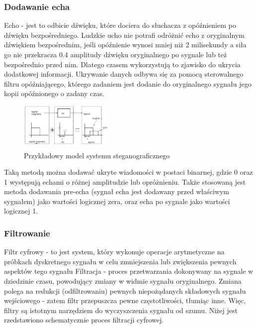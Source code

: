 \documentclass[a4paper,titleauthor]{mwart}
\begin{document}
\subsubsection{Dodawanie echa}
Echo - jest to odbicie dźwięku, które dociera do słuchacza z opóźnieniem po dźwięku bezpośredniego.
\newline\newline
Ludzkie ucho nie potrafi odróżnić echo z oryginalnym dźwiękiem bezpośrednim, jeśli opóźnienie wynosi mniej niż 2 milisekundy a siła go nie przekracza 0.4 amplitudy dźwięku oryginalnego po sygnale lub też bezpośrednio przed nim.
\newline\newline
Dlatego czasem wykorzystują to zjawisko do ukrycia dodatkowej informacji. Ukrywanie danych odbywa się za pomocą sterowalnego filtru opóźniającego, którego zadaniem jest dodanie do oryginalnego sygnału jego kopii opóźnionego o zadany czas. 
\newline\newline

  \begin{figure}[h]
	\centering
	\includegraphics[width=0.4\textwidth]{echo}
	\caption{Przykładowy model systemu steganograficznego}
\end{figure}

Taką metodą można dodawać ukryte wiadomości w postaci binarnej, gdzie 0 oraz 1 występują echami o różnej amplitudzie lub opróżnieniu. Także stosowaną jest metoda dodawania pre-echa (sygnał echa jest dodawany przed właściwym sygnałem) jako wartości logicznej zera, oraz echa po sygnale jako wartości logicznej 1. 
\newline\newline

\subsubsection{Filtrowanie}

Filtr cyfrowy - to jest system, który wykonuje operacje arytmetyczne na próbkach dyskretnego sygnału w celu zmniejszenia lub zwiększenia pewnych aspektów tego sygnału
\newline\newline
Filtracja - proces przetwarzania dokonywany na sygnale w dziedzinie czasu, powodujący zmiany w widmie sygnału oryginalnego. Zmiana polega na redukcji (odfiltrowaniu) pewnych niepożądanych składowych sygnału wejściowego - zatem filtr przepuszcza pewne częstotliwości, tłumiąc inne. Więc, filtry są istotnym narzędziem do wyczyszczenia sygnału od szumu. Niżej jest rzedstawiono schematycznie proces filtracji cyfrowej.
\newline\newline
\end{document}
